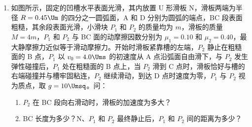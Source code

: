\documentclass[\gkver]{gaokaozhenti}
\begin{document}
\begin{enumerate}



\item
如图所示，固定的凹槽水平表面光滑，其内放置 U 形滑板 N，滑板两端为半径 $R=0.45\Um$ 的四分之一圆弧面，A 和 D 分别为圆弧的端点，BC 段表面粗糙，其余段表面光滑，小滑块 $P_{1}$ 和 $P_{2}$ 的质量均为 $m$，滑板的质量 $M=4m$，$P_{1}$ 和 $P_{2}$ 与 BC 面的动摩擦因数分别为 $\mu_{1}=0.10$ 和 $\mu_{2}=0.40$，最大静摩擦力近似等于滑动摩擦力。开始时滑板紧靠槽的左端，$P_{2}$ 静止在粗糙面的 B 点，$P_{1}$ 以 $v_{0}=4.0\Ums$ 的初速度从 A 点沿弧面自由滑下，与 $P_{2}$ 发生弹性碰撞后，$P_{1}$ 处在粗糙面的 B 点上，当 $P_{2}$ 滑到 C 点时，滑板恰好与槽的右端碰撞并与槽牢固粘连，$P_{2}$ 继续滑动，到达 D 点时速度为零，$P_{1}$ 与 $P_{2}$ 视为质点，取 $g=10\Umsq$。问：

\begin{enumerate}
	\item
	$P_{2}$ 在 BC 段向右滑动时，滑板的加速度为多大？
	\item
	BC 长度为多少？N、$P_{1}$ 和 $P_{2}$ 最终静止后，$P_{1}$ 和 $P_{2}$ 间的距离为多少？
\end{enumerate}


\end{enumerate}
\end{document}
